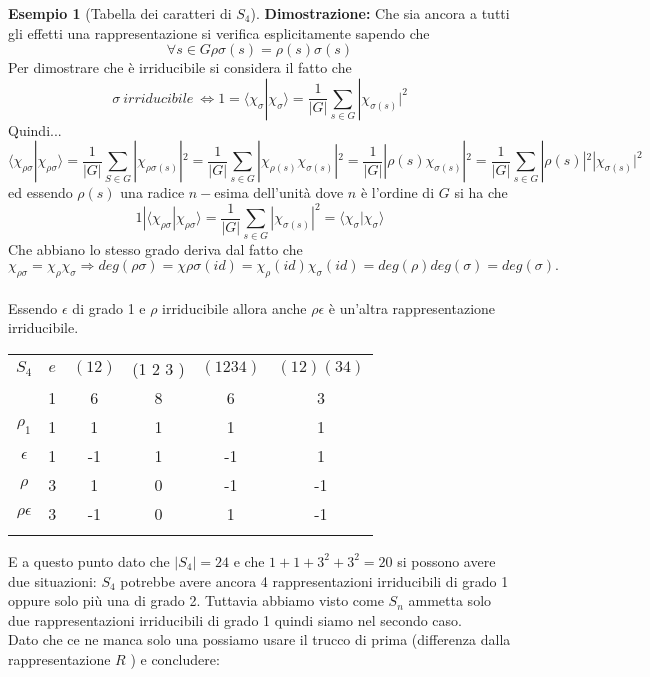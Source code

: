 \documentclass[11pt]{article}
\theoremstyle{plain}
\theoremstyle{definition}
\newtheorem{exmp}{Esempio}[section]
\theoremstyle{remark}
\begin{document}
\begin{exmp}[Tabella dei caratteri di $S_4$]
\textbf{Dimostrazione:} Che sia ancora a tutti gli effetti una rappresentazione si verifica esplicitamente sapendo che
\[
\forall s\in G \rho\sigma(s)=\rho(s)\sigma(s)
\]
Per dimostrare che è irriducibile si considera il fatto che
\[
\sigma \ irriducibile\ \Leftrightarrow 1=\langle\chi_{\sigma}|\chi_{\sigma}\rangle=\frac{1}{|G|}\sum_{s\in G}|\chi_{\sigma(s)}|^2
\]
Quindi...
\[
\langle \chi_{\rho\sigma}|\chi_{\rho\sigma}\rangle=\frac{1}{|G|}\sum_{S\in G}|\chi_{\rho\sigma(s)}|^2=\frac{1}{|G|}\sum_{s\in G}|\chi_{\rho(s)}\chi_{\sigma(s)}|^2=\frac{1}{|G|}|\rho(s)\chi_{\sigma(s)}|^2=\frac{1}{|G|}\sum_{s\in G}|\rho(s)|^2|\chi_{\sigma(s)}|^2
\]
ed essendo $\rho(s)$ una radice $n-$esima dell'unità dove $n$ è l'ordine di $G$ si ha che 
\[1 | 
\langle \chi_{\rho\sigma}|\chi_{\rho\sigma}\rangle=\frac{1}{|G|}\sum_{s\in G}
|\chi_{\sigma(s)}|^2=\langle \chi_{\sigma}|\chi_{\sigma}\rangle
\]
Che abbiano lo stesso grado deriva dal fatto che
\[
\chi_{\rho\sigma}=\chi_{\rho}\chi_{\sigma}\Rightarrow deg(\rho\sigma)=\chi{\rho\sigma}(id)=\chi_{\rho}(id)\chi_{\sigma}(id)=deg(\rho)deg(\sigma)=deg(\sigma).
\] \\
Essendo $\epsilon$ di grado 1 e $\rho$ irriducibile allora anche $\rho\epsilon$ è un'altra rappresentazione irriducibile.


\begin{table}[!ht]
\centering
\begin{tabular}{|c|c|c|c|c|c|}
\hline
$S_4$  & $e$ & $(1 2)$ & (1 2 3 ) & $(1 2 3 4)$ & $(1 2)(3 4)$ \\
 & 1 & 6 & 8 & 6 & 3 \\
\hline
 $\rho_1$ & 1 & 1  & 1 & 1 & 1\\
\hline
$\epsilon$ & 1  & -1 & 1 & -1 & 1 \\
\hline
$\rho$& 3 & 1 & 0 & -1 & -1\\
\hline
$\rho\epsilon$& 3 & -1 & 0 & 1 & -1\\
\hline
& &  & & & \\
\hline
\end{tabular}
\end{table}


E a questo punto dato che $|S_4|=24$ e che $1+1+3^2+3^2=20$ si possono avere due situazioni: $S_4$ potrebbe avere ancora 4 rappresentazioni irriducibili di grado 1 oppure solo più una di grado 2. Tuttavia abbiamo visto come $S_n$ ammetta solo due rappresentazioni irriducibili di grado 1 quindi siamo nel secondo caso.\\
Dato che ce ne manca solo una possiamo usare il trucco di prima (differenza dalla rappresentazione $R$ ) e concludere:


\end{exmp}
\end{document}
